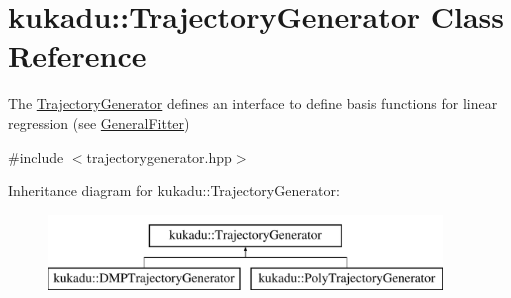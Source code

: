 \hypertarget{classkukadu_1_1TrajectoryGenerator}{\section{kukadu\-:\-:Trajectory\-Generator Class Reference}
\label{classkukadu_1_1TrajectoryGenerator}
}


The \hyperlink{classkukadu_1_1TrajectoryGenerator}{Trajectory\-Generator} defines an interface to define basis functions for linear regression (see \hyperlink{classkukadu_1_1GeneralFitter}{General\-Fitter})  




{\ttfamily \#include $<$trajectorygenerator.\-hpp$>$}

Inheritance diagram for kukadu\-:\-:Trajectory\-Generator\-:\begin{figure}[H]
\begin{center}
\leavevmode
\includegraphics[height=2.000000cm]{classkukadu_1_1TrajectoryGenerator}
\end{center}
\end{figure}
